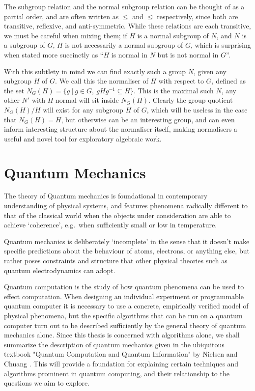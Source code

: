 The subgroup relation and the normal subgroup relation can be thought of as a partial order, and are often written as $\leq$ and $\trianglelefteq$ respectively, since both are transitive, reflexive, and anti-symmetric. While these relations are each transitive, we must be careful when mixing them; if $H$ is a normal subgroup of $N$, and $N$ is a subgroup of $G$, $H$ is not necessarily a normal subgroup of $G$, which is surprising when stated more succinctly as ``$H$ is normal in $N$ but is not normal in $G$''.

With this subtlety in mind we can find exactly such a group $N$, given any subgroup $H$ of $G$. We call this the normaliser of $H$ with respect to $G$, defined as the set $N_G(H) = \{g\ |\ g \in G,\ gHg^{-1} \subseteq H\}$. This is the maximal such $N$, any other $N'$ with $H$ normal will sit inside $N_G(H)$. Clearly the group quotient $N_G(H)/H$ will exist for any subgroup $H$ of $G$, which will be useless in the case that $N_G(H) = H$, but otherwise can be an interesting group, and can even inform interesting structure about the normaliser itself, making normalisers a useful and novel tool for exploratory algebraic work.

\section{Quantum Mechanics}

The theory of Quantum mechanics is foundational in contemporary understanding of physical systems, and features phenomena radically different to that of the classical world when the objects under consideration are able to achieve `coherence', e.g.\ when sufficiently small or low in temperature.

Quantum mechanics is deliberately `incomplete' in the sense that it doesn't make specific predictions about the behaviour of atoms, electrons, or anything else, but rather poses constraints and structure that other physical theories such as quantum electrodynamics can adopt.

Quantum computation is the study of how quantum phenomena can be used to effect computation. When designing an individual experiment or programmable quantum computer it is necessary to use a concrete, empirically verified model of physical phenomena, but the specific algorithms that can be run on a quantum computer turn out to be described sufficiently by the general theory of quantum mechanics alone. Since this thesis is concerned with algorithms alone, we shall summarize the description of quantum mechanics given in the ubiquitous textbook "Quantum Computation and Quantum Information" by Nielsen and Chuang \cite{textbook}. This will provide a foundation for explaining certain techniques and algorithms prominent in quantum computing, and their relationship to the questions we aim to explore.
